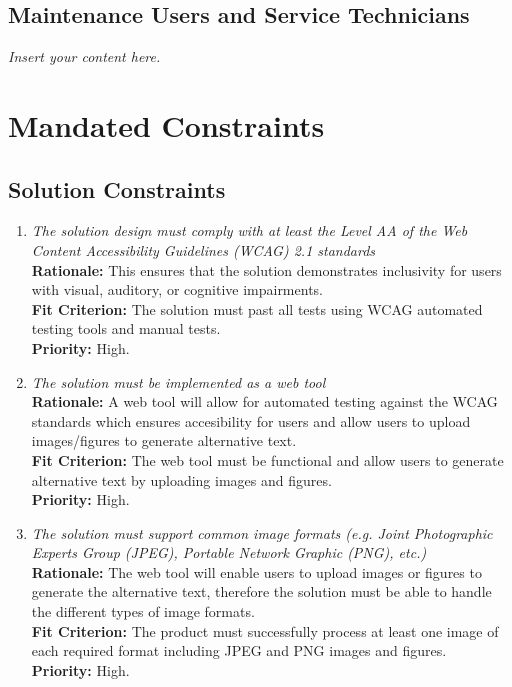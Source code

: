 \documentclass[12pt]{article}
\newcommand{\lips}{\textit{Insert your content here.}}
\begin{document}
\subsection{Maintenance Users and Service Technicians}
\lips

\section{Mandated Constraints}
\subsection{Solution Constraints}
\begin{enumerate}[label=MD-SL \arabic*., wide=0pt, leftmargin=*]
  \item \emph{The solution design must comply with at least the Level AA of the Web Content Accessibility Guidelines (WCAG) 2.1 standards}\\[2mm]
    {\bf Rationale:} This ensures that the solution demonstrates inclusivity for users with visual, auditory, or cognitive impairments. \\
    {\bf Fit Criterion:} The solution must past all tests using WCAG automated testing tools and manual tests.\\
    {\bf Priority:} High.
  \item \emph{The solution must be implemented as a web tool}\\[2mm]
    {\bf Rationale:} A web tool will allow for automated testing against the WCAG standards which ensures accesibility for users 
    and allow users to upload images/figures to generate alternative text.\\
    {\bf Fit Criterion:} The web tool must be functional and allow users to generate alternative text by uploading
    images and figures.\\
    {\bf Priority:} High.
  \item \emph{The solution must support common image formats (e.g. Joint Photographic Experts Group (JPEG), Portable Network Graphic (PNG), etc.)}\\[2mm]
    {\bf Rationale:} The web tool will enable users to upload images or figures to generate the alternative text, therefore the solution must be able 
    to handle the different types of image formats.\\
    {\bf Fit Criterion:} The product must successfully process at least one image of each required format including JPEG and PNG
    images and figures.\\
    {\bf Priority:} High.
\end{enumerate}
\end{document}
